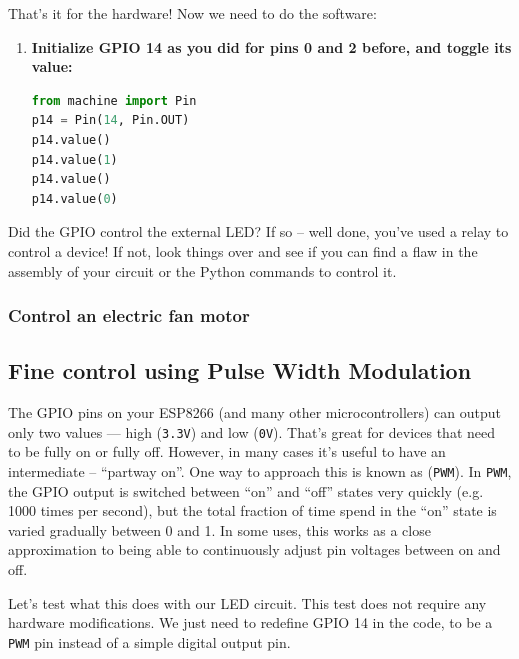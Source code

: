 That’s it for the hardware! Now we need to do the software:

\begin{enumerate}[resume]
	\item \textbf{Initialize GPIO 14 as you did for pins 0 and 2 before, and toggle its value:}
\begin{lstlisting}[language=Python]
from machine import Pin
p14 = Pin(14, Pin.OUT)
p14.value()
p14.value(1)
p14.value()
p14.value(0)
\end{lstlisting}
\end{enumerate}
Did the GPIO control the external LED? If so – well done, you’ve used a relay to control a device!
If not, look things over and see if you can find a flaw in the assembly of your circuit or the Python commands to control it.

\subsubsection{\color{gray}\howto Control an electric fan motor \color{black}}


\subsection{Fine control using Pulse Width Modulation}
The GPIO pins on your ESP8266 (and many other microcontrollers) can output only two values --- high (\texttt{3.3V}) and low (\texttt{0V}).
That's great for devices that need to be fully on or fully off.
However, in many cases it’s useful to have an intermediate -- ``partway on''.
One way to approach this is known as  (\texttt{PWM}).
In \texttt{PWM}, the GPIO output is switched between ``on'' and ``off'' states very quickly (e.g. 1000 times per second), but the total fraction of time spend in the ``on'' state is varied gradually between 0 and 1.
In some uses, this works as a close approximation to being able to continuously adjust pin voltages between on and off.

Let’s test what this does with our LED circuit.
This test does not require any hardware modifications.
We just need to redefine GPIO 14 in the code, to be a \texttt{PWM} pin instead of a simple digital output pin.

